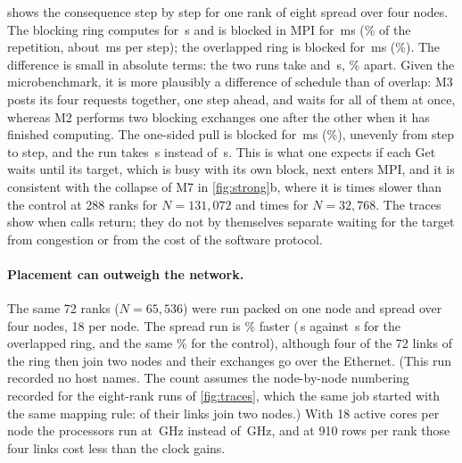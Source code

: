  shows the consequence step by step for one rank of eight spread
over four nodes. The blocking ring computes for \,s and is
blocked in MPI for \,ms (\% of the
repetition, about \,ms per step); the overlapped ring is
blocked for \,ms (\%). The
difference is small in absolute terms: the two runs take  and
\,s, \% apart. Given the
microbenchmark, it is more plausibly a difference of schedule than of overlap: M3
posts its four requests together, one step ahead, and waits for all of them at
once, whereas M2 performs two blocking exchanges one after the other when it has
finished computing. The one-sided pull is blocked for \,ms
(\%), unevenly from step to step, and the run takes
\,s instead of \,s. This is what one
expects if each Get waits until its target, which is busy with its own block, next
enters MPI, and it is consistent with the collapse of M7 in \cref{fig:strong}b,
where it is  times slower than the control at 288
ranks for $N=131{,}072$ and  times for $N=32{,}768$.
The traces show when calls return; they do not by themselves separate waiting for
the target from congestion or from the cost of the software protocol.

\paragraph{Placement can outweigh the network.} The same 72 ranks ($N=65{,}536$)
were run packed on one node and spread over four nodes, 18 per node. The spread
run is \% faster (\,s
against \,s for the overlapped ring, and the same
\% for the control), although four of the 72 links of
the ring then join two nodes and their exchanges go over the Ethernet. (This run
recorded no host names. The count assumes the node-by-node numbering recorded for
the eight-rank runs of \cref{fig:traces}, which the same job started with the same
mapping rule:  of their  links join two
nodes.) With 18 active cores per node the processors run at
\,GHz instead of \,GHz, and at 910 rows per rank those
four links cost less than the clock gains.

